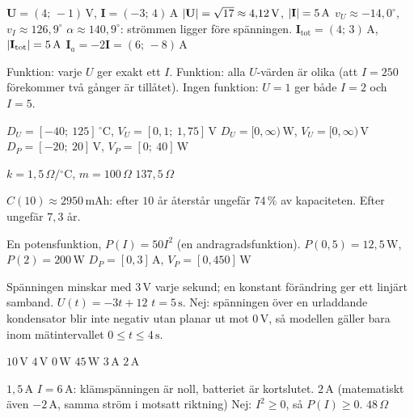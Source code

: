 
\begin{facit}

  $\mathbf{U} = (4;\, -1)\,\text{V}$, $\mathbf{I} = (-3;\, 4)\,\text{A}$
 $\lvert\mathbf{U}\rvert = \sqrt{17} \approx 4{,}12\,\text{V}$, $\lvert\mathbf{I}\rvert = 5\,\text{A}$
 $v_U \approx -14{,}0^{\circ}$, $v_I \approx 126{,}9^{\circ}$
 $\alpha \approx 140{,}9^{\circ}$: strömmen ligger före spänningen.
 $\mathbf{I}_{\text{tot}} = (4;\, 3)\,\text{A}$, $\lvert\mathbf{I}_{\text{tot}}\rvert = 5\,\text{A}$
 $\mathbf{I}_a = -2\mathbf{I} = (6;\, -8)\,\text{A}$

  Funktion: varje $U$ ger exakt ett $I$.
 Funktion: alla $U$-värden är olika (att $I = 250$ förekommer två gånger är tillåtet).
 Ingen funktion: $U = 1$ ger både $I = 2$ och $I = 5$.

  $D_U = [-40;\ 125]\,^{\circ}\text{C}$, $V_U = [0{,}1;\ 1{,}75]\,\text{V}$
 $D_U = [0, \infty)\,\text{W}$, $V_U = [0, \infty)\,\text{V}$
 $D_P = [-20;\ 20]\,\text{V}$, $V_P = [0;\ 40]\,\text{W}$

  $k = 1{,}5\,\Omega/{}^{\circ}\text{C}$, $m = 100\,\Omega$
 $137{,}5\,\Omega$

  $C(10) \approx 2950\,\text{mAh}$: efter $10$ år återstår ungefär $74\,\%$ av kapaciteten.
 Efter ungefär $7{,}3$ år.

  En potensfunktion, $P(I) = 50I^2$ (en andragradsfunktion).
 $P(0{,}5) = 12{,}5\,\text{W}$, $P(2) = 200\,\text{W}$
 $D_P = [0, 3]\,\text{A}$, $V_P = [0, 450]\,\text{W}$

  Spänningen minskar med $3\,\text{V}$ varje sekund; en konstant förändring ger
ett linjärt samband.
 $U(t) = -3t + 12$
 $t = 5\,\text{s}$. Nej: spänningen över en urladdande kondensator blir inte negativ utan
planar ut mot $0\,\text{V}$, så modellen gäller bara inom mätintervallet
$0 \leq t \leq 4\,\text{s}$.

  $10\,\text{V}$  $4\,\text{V}$  $0\,\text{W}$  $45\,\text{W}$  $3\,\text{A}$  $2\,\text{A}$

  $1{,}5\,\text{A}$  $I = 6\,\text{A}$: klämspänningen är noll, batteriet är kortslutet.
 $2\,\text{A}$ (matematiskt även $-2\,\text{A}$, samma ström i motsatt riktning)
 Nej: $I^2 \geq 0$, så $P(I) \geq 0$.  $48\,\Omega$


\end{facit}

